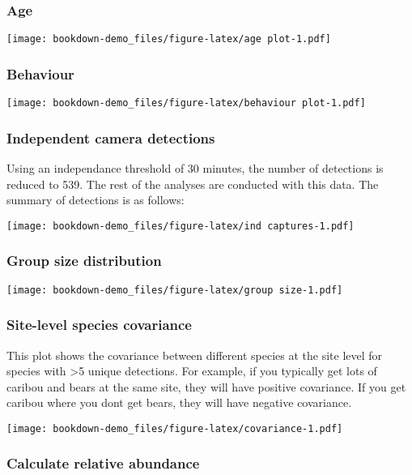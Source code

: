 \documentclass[]{book}
\begin{document}
\subsubsection{Age}\label{age}

\texttt{[image: bookdown-demo\_files/figure-latex/age plot-1.pdf]}

\subsubsection{Behaviour}\label{behaviour}

\texttt{[image: bookdown-demo\_files/figure-latex/behaviour plot-1.pdf]}

\subsubsection{Independent camera
detections}\label{independent-camera-detections}

Using an independance threshold of 30 minutes, the number of detections
is reduced to 539. The rest of the analyses are conducted with this
data. The summary of detections is as follows:

\texttt{[image: bookdown-demo\_files/figure-latex/ind captures-1.pdf]}

\subsubsection{Group size distribution}\label{group-size-distribution}

\texttt{[image: bookdown-demo\_files/figure-latex/group size-1.pdf]}

\subsubsection{Site-level species
covariance}\label{site-level-species-covariance}

This plot shows the covariance between different species at the site
level for species with \textgreater{}5 unique detections. For example,
if you typically get lots of caribou and bears at the same site, they
will have positive covariance. If you get caribou where you dont get
bears, they will have negative covariance.

\texttt{[image: bookdown-demo\_files/figure-latex/covariance-1.pdf]}

\subsubsection{Calculate relative
abundance}\label{calculate-relative-abundance}
\end{document}
